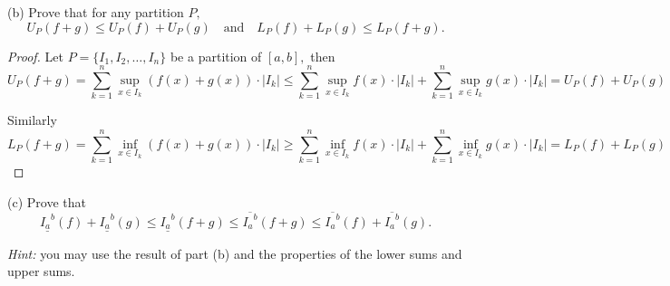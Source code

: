 \documentclass{article}
\begin{document}
\begin{problem*}[4b]
    (b) Prove that for any partition $P,$
    \[
        U_P(f+g) \le U_P(f) + U_P(g) \quad \text{and} \quad L_P(f) + L_P(g) \le L_P(f+g).
    \]
\end{problem*}

\begin{proof}
    Let $P = \{I_1, I_2, \ldots, I_n \}$ be a partition of $[a,b],$ then
    \[
        U_P(f+g) = \sum_{k=1}^{n} \sup_{x \in I_k} (f(x) + g(x)) \cdot |I_k|
        \le \sum_{k=1}^{n} \sup_{x \in I_k} f(x) \cdot |I_k| + \sum_{k=1}^{n} \sup_{x \in I_k} g(x) \cdot |I_k|
        = U_P(f) + U_P(g)
    \]

    Similarly 
    \[
        L_P(f+g) = \sum_{k=1}^{n} \inf_{x \in I_k} (f(x) + g(x)) \cdot |I_k|
        \ge \sum_{k=1}^{n} \inf_{x \in I_k} f(x) \cdot |I_k| + \sum_{k=1}^{n} \inf_{x \in I_k} g(x) \cdot |I_k|
        = L_P(f) + L_P(g)
    \]
\end{proof}

\newpage

\begin{problem*}[4c]
    (c) Prove that 
    \[
        \underline{{I_a}^b}(f) + \underline{{I_a}^b}(g) \le \underline{{I_a}^b}(f+g) 
        \le \overline{{I_a}^b}(f+g) \le \overline{{I_a}^b}(f) + \overline{{I_a}^b}(g).
    \]

    \textit{Hint:} you may use the result of part (b) and the properties of the lower sums and upper sums.
\end{problem*}
\end{document}
